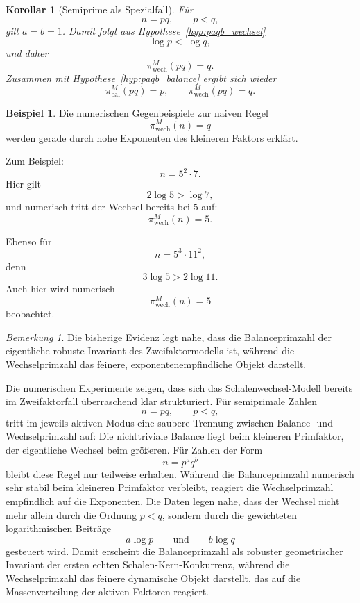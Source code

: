 \documentclass[11pt,a4paper]{article}
\newtheorem{korollar}[satz]{Korollar}
\theoremstyle{definition}
\newtheorem{beispiel}[satz]{Beispiel}
\theoremstyle{remark}
\newtheorem{bemerkung}[satz]{Bemerkung}
\begin{document}
	\begin{korollar}[Semiprime als Spezialfall]
		\label{kor:semiprime_spezialfall_logmasse}
		Für
		\[
		n=pq,\qquad p<q,
		\]
		gilt \(a=b=1\). Damit folgt aus Hypothese~\ref{hyp:paqb_wechsel}
		\[
		\log p<\log q,
		\]
		und daher
		\[
		\pi_{\mathrm{wech}}^{M}(pq)=q.
		\]
		Zusammen mit Hypothese~\ref{hyp:paqb_balance} ergibt sich wieder
		\[
		\pi_{\mathrm{bal}}^{M}(pq)=p,\qquad
		\pi_{\mathrm{wech}}^{M}(pq)=q.
		\]
	\end{korollar}
	
	\begin{beispiel}
		Die numerischen Gegenbeispiele zur naiven Regel
		\[
		\pi_{\mathrm{wech}}^{M}(n)=q
		\]
		werden gerade durch hohe Exponenten des kleineren Faktors erklärt.
		
		Zum Beispiel:
		\[
		n=5^2\cdot 7.
		\]
		Hier gilt
		\[
		2\log 5 > \log 7,
		\]
		und numerisch tritt der Wechsel bereits bei \(5\) auf:
		\[
		\pi_{\mathrm{wech}}^{M}(n)=5.
		\]
		
		Ebenso für
		\[
		n=5^3\cdot 11^2,
		\]
		denn
		\[
		3\log 5 > 2\log 11.
		\]
		Auch hier wird numerisch
		\[
		\pi_{\mathrm{wech}}^{M}(n)=5
		\]
		beobachtet.
	\end{beispiel}
	
	\begin{bemerkung}
		Die bisherige Evidenz legt nahe, dass die Balanceprimzahl der eigentliche robuste Invariant
		des Zweifaktormodells ist, während die Wechselprimzahl das feinere, exponentenempfindliche
		Objekt darstellt.
	\end{bemerkung}
	
	Die numerischen Experimente zeigen, dass sich das Schalenwechsel-Modell bereits im
	Zweifaktorfall überraschend klar strukturiert. Für semiprimale Zahlen
	\[
	n=pq,\qquad p<q,
	\]
	tritt im jeweils aktiven Modus eine saubere Trennung zwischen Balance- und
	Wechselprimzahl auf: Die nichttriviale Balance liegt beim kleineren Primfaktor,
	der eigentliche Wechsel beim größeren. Für Zahlen der Form
	\[
	n=p^a q^b
	\]
	bleibt diese Regel nur teilweise erhalten. Während die Balanceprimzahl numerisch
	sehr stabil beim kleineren Primfaktor verbleibt, reagiert die Wechselprimzahl
	empfindlich auf die Exponenten. Die Daten legen nahe, dass der Wechsel nicht
	mehr allein durch die Ordnung \(p<q\), sondern durch die gewichteten logarithmischen
	Beiträge
	\[
	a\log p
	\qquad\text{und}\qquad
	b\log q
	\]
	gesteuert wird. Damit erscheint die Balanceprimzahl als robuster geometrischer
	Invariant der ersten echten Schalen-Kern-Konkurrenz, während die Wechselprimzahl
	das feinere dynamische Objekt darstellt, das auf die Massenverteilung der
	aktiven Faktoren reagiert.
	
\end{document}
